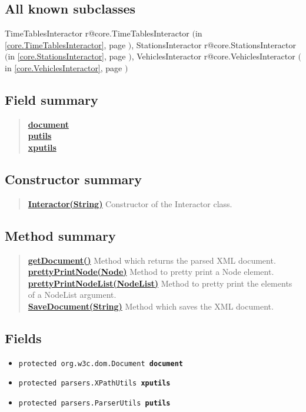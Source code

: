 \documentclass[11pt,a4paper]{report}
\makeatletter
\newcommand{\refdefined}[1]{
\expandafter\ifx\csname r@#1\endcsname\relax
\relax\else
{$($in \ref{#1}, page \pageref{#1}$)$}\fi}
\makeatother
\begin{document}
{{{{{\subsection{All known subclasses}{TimeTablesInteractor\small{\refdefined{core.TimeTablesInteractor}}, StationsInteractor\small{\refdefined{core.StationsInteractor}}, VehiclesInteractor\small{\refdefined{core.VehiclesInteractor}}}
\subsection{Field summary}{
\begin{verse}
\hyperlink{core.Interactor.document}{{\bf document}} \\
\hyperlink{core.Interactor.putils}{{\bf putils}} \\
\hyperlink{core.Interactor.xputils}{{\bf xputils}} \\
\end{verse}
}
\subsection{Constructor summary}{
\begin{verse}
\hyperlink{core.Interactor(java.lang.String)}{{\bf Interactor(String)}} Constructor of the Interactor class.\\
\end{verse}
}
\subsection{Method summary}{
\begin{verse}
\hyperlink{core.Interactor.getDocument()}{{\bf getDocument()}} Method which returns the parsed XML document.\\
\hyperlink{core.Interactor.prettyPrintNode(org.w3c.dom.Node)}{{\bf prettyPrintNode(Node)}} Method to pretty print a Node element.\\
\hyperlink{core.Interactor.prettyPrintNodeList(org.w3c.dom.NodeList)}{{\bf prettyPrintNodeList(NodeList)}} Method to pretty print the elements of a NodeList argument.\\
\hyperlink{core.Interactor.SaveDocument(java.lang.String)}{{\bf SaveDocument(String)}} Method which saves the XML document.\\
\end{verse}
}
\subsection{Fields}{
\begin{itemize}
\item{
\label{core.Interactor.document}\hypertarget{core.Interactor.document}{\texttt{protected org.w3c.dom.Document\ {\bf  document}}
}
}
\item{
\label{core.Interactor.xputils}\hypertarget{core.Interactor.xputils}{\texttt{protected parsers.XPathUtils\ {\bf  xputils}}
}
}
\item{
\label{core.Interactor.putils}\hypertarget{core.Interactor.putils}{\texttt{protected parsers.ParserUtils\ {\bf  putils}}
}
}
\end{itemize}
}
}}}}}
\end{document}
